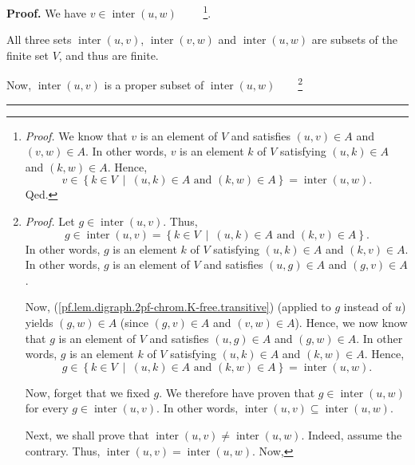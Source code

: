 \documentclass[numbers=enddot,12pt,final,onecolumn,notitlepage]{scrartcl}%
\theoremstyle{definition}
\newenvironment{proof}[1][Proof]{\noindent\textbf{#1.} }{\ \rule{0.5em}{0.5em}}
\newenvironment{verlong}{}{}
\begin{document}
\begin{verlong}
\begin{proof}
We have $v\in\operatorname*{inter}\left(  u,w\right)  $%
\ \ \ \ \footnote{\textit{Proof.} We know that $v$ is an element of $V$ and
satisfies $\left(  u,v\right)  \in A$ and $\left(  v,w\right)  \in A$. In
other words, $v$ is an element $k$ of $V$ satisfying $\left(  u,k\right)  \in
A$ and $\left(  k,w\right)  \in A$. Hence,%
\[
v\in\left\{  k\in V\ \mid\ \left(  u,k\right)  \in A\text{ and }\left(
k,w\right)  \in A\right\}  =\operatorname*{inter}\left(  u,w\right)  .
\]
Qed.}.

All three sets $\operatorname*{inter}\left(  u,v\right)  $,
$\operatorname*{inter}\left(  v,w\right)  $ and $\operatorname*{inter}\left(
u,w\right)  $ are subsets of the finite set $V$, and thus are finite.

Now, $\operatorname*{inter}\left(  u,v\right)  $ is a proper subset of
$\operatorname*{inter}\left(  u,w\right)  $\ \ \ \ \footnote{\textit{Proof.}
Let $g\in\operatorname*{inter}\left(  u,v\right)  $. Thus,%
\[
g\in\operatorname*{inter}\left(  u,v\right)  =\left\{  k\in V\ \mid\ \left(
u,k\right)  \in A\text{ and }\left(  k,v\right)  \in A\right\}  .
\]
In other words, $g$ is an element $k$ of $V$ satisfying $\left(  u,k\right)
\in A$ and $\left(  k,v\right)  \in A$. In other words, $g$ is an element of
$V$ and satisfies $\left(  u,g\right)  \in A$ and $\left(  g,v\right)  \in A$.
\par
Now, (\ref{pf.lem.digraph.2pf-chrom.K-free.transitive}) (applied to $g$
instead of $u$) yields $\left(  g,w\right)  \in A$ (since $\left(  g,v\right)
\in A$ and $\left(  v,w\right)  \in A$). Hence, we now know that $g$ is an
element of $V$ and satisfies $\left(  u,g\right)  \in A$ and $\left(
g,w\right)  \in A$. In other words, $g$ is an element $k$ of $V$ satisfying
$\left(  u,k\right)  \in A$ and $\left(  k,w\right)  \in A$. Hence,%
\[
g\in\left\{  k\in V\ \mid\ \left(  u,k\right)  \in A\text{ and }\left(
k,w\right)  \in A\right\}  =\operatorname*{inter}\left(  u,w\right)  .
\]
\par
Now, forget that we fixed $g$. We therefore have proven that $g\in
\operatorname*{inter}\left(  u,w\right)  $ for every $g\in
\operatorname*{inter}\left(  u,v\right)  $. In other words,
$\operatorname*{inter}\left(  u,v\right)  \subseteq\operatorname*{inter}%
\left(  u,w\right)  $.
\par
Next, we shall prove that $\operatorname*{inter}\left(  u,v\right)
\neq\operatorname*{inter}\left(  u,w\right)  $. Indeed, assume the contrary.
Thus, $\operatorname*{inter}\left(  u,v\right)  =\operatorname*{inter}\left(
u,w\right)  $. Now,%
}
\end{proof}
\end{verlong}
\end{document}
